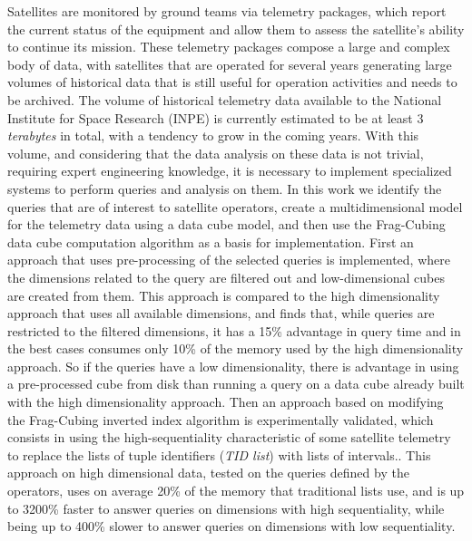 
\begin{resumo}

\hypertarget{estilo:resumo}{} %

Satellites are monitored by ground teams via telemetry packages, which report the current status of the equipment and allow them to assess the satellite's ability to continue its mission.
These telemetry packages compose a large and complex body of data, with satellites that are operated for several years generating large volumes of historical data that is still useful for operation activities and needs to be archived.
The volume of historical telemetry data available to the National Institute for Space Research (INPE) is currently estimated to be at least 3 \textit{terabytes} in total, with a tendency to grow in the coming years.
With this volume, and considering that the data analysis on these data is not trivial, requiring expert engineering knowledge, it is necessary to implement specialized systems to perform queries and analysis on them.
In this work we identify the queries that are of interest to satellite operators, create a multidimensional model for the telemetry data using a data cube model, and then use the Frag-Cubing data cube computation algorithm as a basis for implementation.
First an approach that uses pre-processing of the selected queries is implemented, where the dimensions related to the query are filtered out and low-dimensional cubes are created from them.
This approach is compared to the high dimensionality approach that uses all available dimensions, and finds that, while queries are restricted to the filtered dimensions, it has a 15\% advantage in query time and in the best cases consumes only 10\% of the memory used by the high dimensionality approach.
So if the queries have a low dimensionality, there is advantage in using a pre-processed cube from disk than running a query on a data cube already built with the high dimensionality approach.
Then an approach based on modifying the Frag-Cubing inverted index algorithm is experimentally validated, which consists in using the high-sequentiality characteristic of some satellite telemetry to replace the lists of tuple identifiers (\textit{TID list}) with lists of intervals..
This approach on high dimensional data, tested on the queries defined by the operators, uses on average 20\% of the memory that traditional lists use, and is up to 3200\% faster to answer queries on dimensions with high sequentiality, while being up to 400\% slower to answer queries on dimensions with low sequentiality.


\end{resumo}
